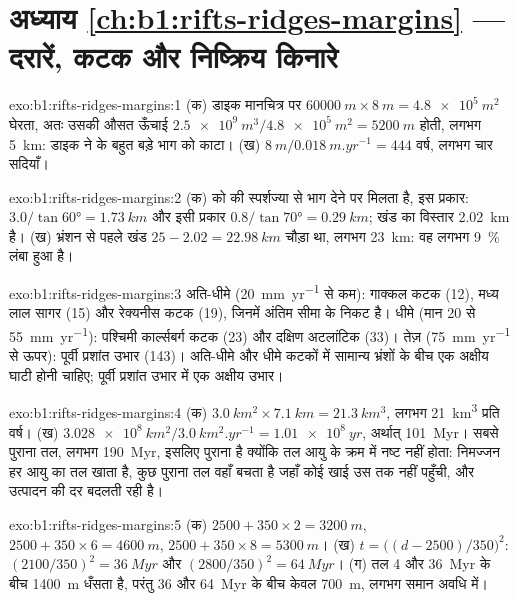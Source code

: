 \section*{अध्याय \ref{ch:b1:rifts-ridges-margins} --- दरारें, कटक और निष्क्रिय किनारे}

\begin{solution}{exo:b1:rifts-ridges-margins:1}
(क) डाइक मानचित्र पर $\qty{60000}{m}\times\qty{8}{m} = \qty{4.8e5}{m^2}$ घेरता, अतः उसकी औसत ऊँचाई $\qty{2.5e9}{m^3}/\qty{4.8e5}{m^2} =
\qty{5200}{m}$ होती, लगभग \qty{5}{km}: डाइक ने  के बहुत बड़े भाग को काटा। (ख) $\qty{8}{m}/\qty{0.018}{m.yr^{-1}} = 444$ वर्ष, लगभग चार सदियाँ।
\end{solution}

\begin{solution}{exo:b1:rifts-ridges-margins:2}
(क)   को  की स्पर्शज्या से भाग देने पर मिलता है, इस प्रकार:
$3.0/\tan\ang{60} = \qty{1.73}{km}$ और इसी प्रकार $0.8/\tan\ang{70} = \qty{0.29}{km}$;
खंड का विस्तार \qty{2.02}{km} है। (ख) भ्रंशन से पहले खंड $25 - 2.02 = \qty{22.98}{km}$ चौड़ा था, लगभग \qty{23}{km}: वह लगभग \qty{9}{\percent} लंबा हुआ है।
\end{solution}

\begin{solution}{exo:b1:rifts-ridges-margins:3}
अति-धीमे (\qty{20}{mm.yr^{-1}} से कम): गाक्कल कटक (12), मध्य लाल सागर (15) और रेक्यनीस कटक (19), जिनमें अंतिम सीमा के निकट है। धीमे (मान 20 से \qty{55}{mm.yr^{-1}}): पश्चिमी कार्ल्सबर्ग कटक (23) और दक्षिण अटलांटिक (33)। तेज़ (\qty{75}{mm.yr^{-1}} से ऊपर): पूर्वी प्रशांत उभार (143)। अति-धीमे और धीमे कटकों में सामान्य भ्रंशों के बीच एक अक्षीय घाटी होनी चाहिए; पूर्वी प्रशांत उभार में एक अक्षीय उभार।
\end{solution}

\begin{solution}{exo:b1:rifts-ridges-margins:4}
(क) $\qty{3.0}{km^2}\times\qty{7.1}{km} = \qty{21.3}{km^3}$, लगभग
\qty{21}{km^3} प्रति वर्ष। (ख) $\qty{3.028e8}{km^2}/\qty{3.0}{km^2.yr^{-1}} =
\qty{1.01e8}{yr}$, अर्थात् \qty{101}{Myr}। सबसे पुराना तल, लगभग \qty{190}{Myr}, इसलिए पुराना है क्योंकि तल आयु के क्रम में नष्ट नहीं होता: निमज्जन हर आयु का तल खाता है, कुछ पुराना तल वहाँ बचता है जहाँ कोई खाई उस तक नहीं पहुँची, और उत्पादन की दर बदलती रही है।
\end{solution}

\begin{solution}{exo:b1:rifts-ridges-margins:5}
(क) $2500 + 350\times2 = \qty{3200}{m}$, $2500 + 350\times6 = \qty{4600}{m}$,
$2500 + 350\times8 = \qty{5300}{m}$। (ख) $t = \bigl((d - 2500)/350\bigr)^2$:
$(2100/350)^2 = \qty{36}{Myr}$ और $(2800/350)^2 = \qty{64}{Myr}$। (ग) तल 4 और \qty{36}{Myr} के बीच \qty{1400}{m} धँसता है, परंतु 36 और \qty{64}{Myr} के बीच केवल \qty{700}{m}, लगभग समान अवधि में।
\end{solution}

